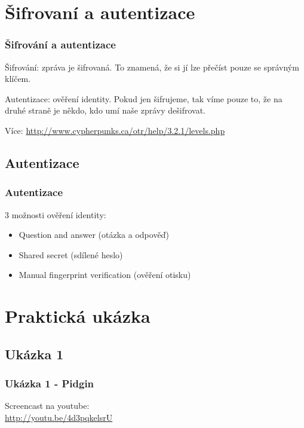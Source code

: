 \documentclass[xetex]{beamer}
\begin{document}
\section{Šifrovaní a autentizace}
\begin{frame}
	\frametitle{Šifrování a autentizace}
	\begin{block}{Šifrování:} zpráva je šifrovaná. To znamená, že si jí lze přečíst pouze se správným klíčem.
	\end{block}

	\begin{block}{Autentizace:} ověření identity. Pokud jen šifrujeme, tak víme pouze to, že na druhé straně je někdo, kdo umí naše zprávy dešifrovat.
	\end{block}

	Více: \url{http://www.cypherpunks.ca/otr/help/3.2.1/levels.php}
\end{frame}

\subsection{Autentizace}
\begin{frame}
	\frametitle{Autentizace}
	3 možnosti ověření identity:
	\begin{itemize}
		\item<1-> Question and answer (otázka a odpověď)
		\item<2-> Shared secret (sdílené heslo)
		\item<3-> Manual fingerprint verification (ověření otisku)
	\end{itemize}
\end{frame}

\section{Praktická ukázka}

\subsection{Ukázka 1}
\begin{frame}
	\frametitle{Ukázka 1 - Pidgin}

	Screencast na youtube:\\ \url{http://youtu.be/4d3pqkelsrU}
\end{frame}
\end{document}
